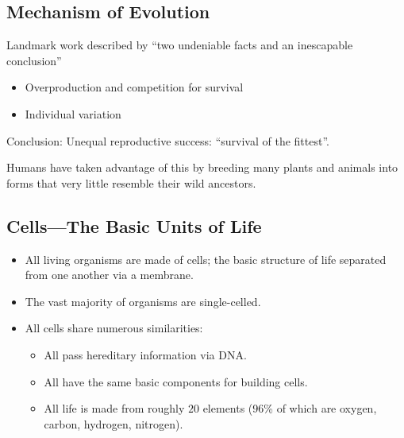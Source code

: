 \documentclass[class=article, crop=false]{standalone}
\begin{document}
  \subsection{Mechanism of Evolution}
  Landmark work described by ``two undeniable facts and an inescapable conclusion''
  \begin{itemize}
    \item Overproduction and competition for survival
    \item Individual variation
  \end{itemize}
  Conclusion: Unequal reproductive success: ``survival of the fittest''.
  \begin{note}{}
    Humans have taken advantage of this by breeding many plants and animals into forms that very little resemble their wild ancestors.
  \end{note}
  \subsection{Cells---The Basic Units of Life}
  \begin{itemize}
    \item All living organisms are made of cells; the basic structure of life separated from one another via a membrane.
    \item The vast majority of organisms are single-celled.
    \item All cells share numerous similarities:
    \begin{itemize}
      \item All pass hereditary information via DNA.
      \item All have the same basic components for building cells.
      \item All life is made from roughly $20$ elements (96\% of which are oxygen, carbon, hydrogen, nitrogen).
    \end{itemize}
  \end{itemize}
\end{document}
